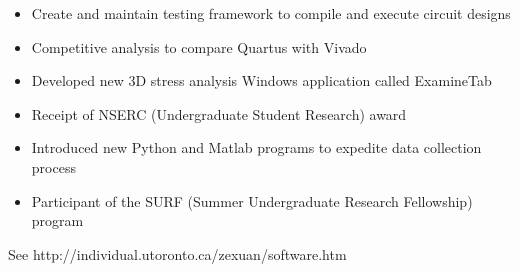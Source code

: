 \documentclass[10pt,a4paper,normalphoto]{altacv}
\begin{document}
\begin{paracol}{2}
            \begin{itemize}
                \item Create and maintain testing framework to compile and execute circuit designs
                \item Competitive analysis to compare Quartus with Vivado
            \end{itemize}
            \divider
            
            \begin{itemize}
                \item Developed new 3D stress analysis Windows application called ExamineTab
                \item Receipt of NSERC (Undergraduate Student Research) award
            \end{itemize}
            \divider
            
            \begin{itemize}
                \item Introduced new Python and Matlab programs to expedite data collection process
                \item Participant of the SURF (Summer Undergraduate Research Fellowship) program
            \end{itemize}
            \divider
        
        
            See http://individual.utoronto.ca/zexuan/software.htm
    \end{paracol}
\end{document}

